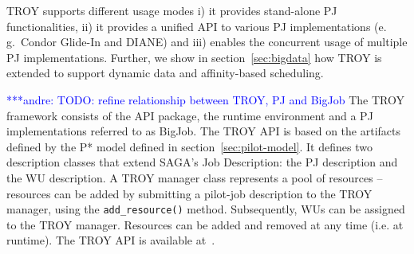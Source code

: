 \documentclass[conference,final]{IEEEtran}
\newcommand{\jhanote}[1]{ {\textcolor{red} { ***shantenu: #1 }}}
\newcommand{\alnote}[1]{ {\textcolor{blue} { ***andre: #1 }}}
\newcommand{\note}[1]{ {\textcolor{magenta} { ***Note: #1 }}}
\newcommand{\alnote}[1]{}
\newcommand{\jhanote}[1]{}
\newcommand{\note}[1]{}
\begin{document}
TROY supports different usage modes i) it provides stand-alone PJ
functionalities, ii) it provides a unified API to various PJ
implementations (e.\,g.\ Condor Glide-In and DIANE) and iii) enables
the concurrent usage of multiple PJ implementations. Further, we show
in section~\ref{sec:bigdata} how TROY is extended to support dynamic
data and affinity-based scheduling.

\alnote{TODO: refine relationship between TROY, PJ and BigJob}
The TROY framework consists of the API package, the runtime
environment and a PJ implementations referred to as BigJob. 
The TROY API is based on the artifacts defined by the P* model
defined in section~\ref{sec:pilot-model}. It defines two description
classes that extend SAGA's Job Description: the PJ description
and the WU description. A TROY manager class represents a pool of
resources -- resources can be added by submitting a pilot-job
description to the TROY manager, using the \texttt{add\_resource()}
method. Subsequently, WUs can be assigned to the TROY manager. 
Resources can be added and removed at any time (i.e. at runtime).  
The TROY API is available at~\cite{troy_api}.


 


\end{document}
